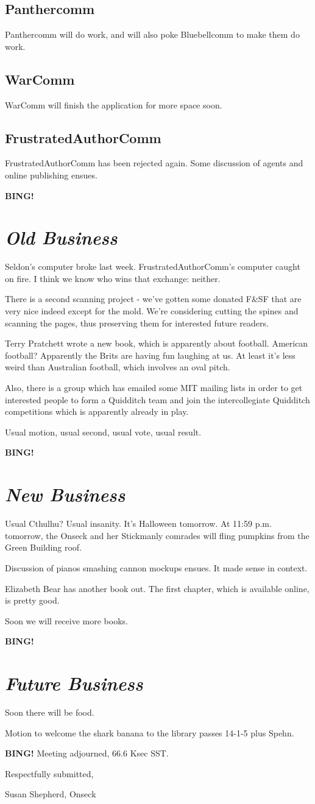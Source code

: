 \documentclass[10pt]{article}
\newcommand{\bing}{{\bf BING!} }
\newcommand{\goto}[1]{\bing \vskip 12pt \section*{{\em{#1}}}}
\newcommand{\ps}{ plus Spehn\xspace}
\begin{document}
\subsection*{Panthercomm}
Panthercomm will do work, and will also poke Bluebellcomm to make them do work.

\subsection*{WarComm}
WarComm will finish the application for more space soon.

\subsection*{FrustratedAuthorComm}
FrustratedAuthorComm has been rejected again. Some discussion of agents and online publishing ensues.

\goto{Old Business}

Seldon's computer broke last week. FrustratedAuthorComm's computer caught on fire. I think we know who wins that exchange: neither.

There is a second scanning project - we've gotten some donated F&SF that are very nice indeed except for the mold. We're considering cutting the spines and scanning the pages, thus preserving them for interested future readers.

Terry Pratchett wrote a new book, which is apparently about football. American football? Apparently the Brits are having fun laughing at us. At least it's less weird than Australian football, which involves an oval pitch.

Also, there is a group which has emailed some MIT mailing lists in order to get interested people to form a Quidditch team and join the intercollegiate Quidditch competitions which is apparently already in play.

Usual motion, usual second, usual vote, usual result.

\goto{New Business}

Usual Cthulhu? Usual insanity. It's Halloween tomorrow. At 11:59 p.m. tomorrow, the Onseck and her Stickmanly comrades will fling pumpkins from the Green Building roof.

Discussion of pianos smashing cannon mockups ensues. It made sense in context.

Elizabeth Bear has another book out. The first chapter, which is available online, is pretty good.

Soon we will receive more books.

\goto{Future Business}

Soon there will be food.

Motion to welcome the shark banana to the library passes 14-1-5\ps.

\bing
\noindent
Meeting adjourned, 66.6 Ksec SST.

\vspace{18pt}

\centerline{Respectfully submitted,}
\centerline{Susan Shepherd, Onseck}
\end{document}
